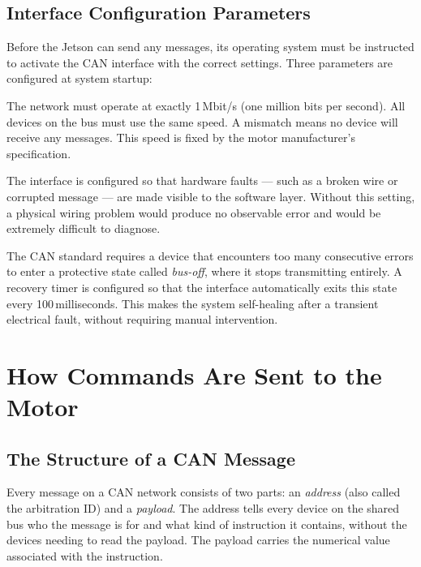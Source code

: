 \documentclass[12pt,a4paper]{article}
\begin{document}
\subsection{Interface Configuration Parameters}

Before the Jetson can send any messages, its operating system must be
instructed to activate the CAN interface with the correct settings.
Three parameters are configured at system startup:

\begin{description}[leftmargin=3.5cm, style=nextline]
  \item[Bus speed] The network must operate at exactly 1\,Mbit/s (one
    million bits per second). All devices on the bus must use the same
    speed. A mismatch means no device will receive any messages. This
    speed is fixed by the motor manufacturer's specification.

  \item[Error reporting] The interface is configured so that hardware
    faults --- such as a broken wire or corrupted message --- are made
    visible to the software layer. Without this setting, a physical
    wiring problem would produce no observable error and would be
    extremely difficult to diagnose.

  \item[Automatic recovery] The CAN standard requires a device that
    encounters too many consecutive errors to enter a protective state
    called \emph{bus-off}, where it stops transmitting entirely.
    A recovery timer is configured so that the interface automatically
    exits this state every 100\,milliseconds. This makes the system
    self-healing after a transient electrical fault, without requiring
    manual intervention.
\end{description}

\section{How Commands Are Sent to the Motor}
\label{sec:protocol}

\subsection{The Structure of a CAN Message}

Every message on a CAN network consists of two parts: an \emph{address}
(also called the arbitration ID) and a \emph{payload}. The address tells
every device on the shared bus who the message is for and what kind of
instruction it contains, without the devices needing to read the payload.
The payload carries the numerical value associated with the instruction.
\end{document}
